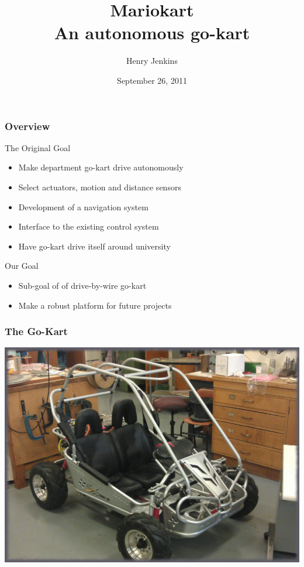 \documentclass{beamer}
\begin{document}
\ECFAugie

\begin{frame}
\title{Mariokart \\ An autonomous go-kart}
\author{Henry Jenkins}
\date{September 26, 2011}
\maketitle
\end{frame}

\begin{frame}
\frametitle{Overview}
The Original Goal
\begin{itemize}
\item Make department go-kart drive autonomously
\item Select actuators, motion and distance sensors
\item Development of a navigation system
\item Interface to the existing control system
\item Have go-kart drive itself around university
\end{itemize}

Our Goal
\begin{itemize}
\item Sub-goal of of drive-by-wire go-kart
\item Make a robust platform for future projects
\end{itemize}
\end{frame}

\begin{frame}
\frametitle{The Go-Kart}
    \begin{center}
      \includegraphics[width=.90\textwidth]{Images/kart.jpg}
    \end{center}
\end{frame}
\end{document}
